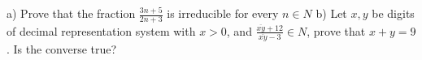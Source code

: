 a) Prove that the fraction $\frac{3n+5}{2n+3}$ is irreducible for every $n \in N$
b) Let $x,y$ be digits of decimal representation system with $x>0$, and $\frac{\overline{xy}+12}{\overline{xy}-3}\in N$, prove that $x+y=9$. Is the converse true?